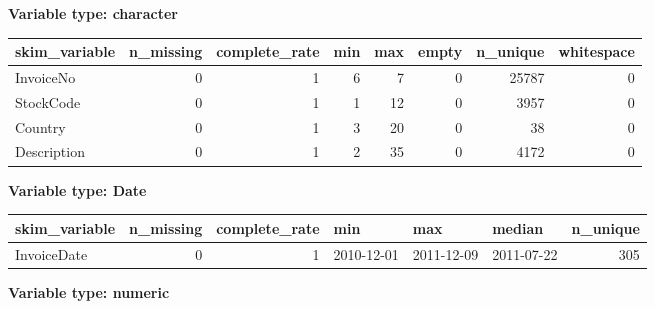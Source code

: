 \documentclass[]{article}
\begin{document}
\textbf{Variable type: character}

\begin{longtable}[]{@{}lrrrrrrr@{}}
\toprule
skim\_variable & n\_missing & complete\_rate & min & max & empty &
n\_unique & whitespace\tabularnewline
\midrule
\endhead
InvoiceNo & 0 & 1 & 6 & 7 & 0 & 25787 & 0\tabularnewline
StockCode & 0 & 1 & 1 & 12 & 0 & 3957 & 0\tabularnewline
Country & 0 & 1 & 3 & 20 & 0 & 38 & 0\tabularnewline
Description & 0 & 1 & 2 & 35 & 0 & 4172 & 0\tabularnewline
\bottomrule
\end{longtable}

\textbf{Variable type: Date}

\begin{longtable}[]{@{}lrrlllr@{}}
\toprule
skim\_variable & n\_missing & complete\_rate & min & max & median &
n\_unique\tabularnewline
\midrule
\endhead
InvoiceDate & 0 & 1 & 2010-12-01 & 2011-12-09 & 2011-07-22 &
305\tabularnewline
\bottomrule
\end{longtable}

\textbf{Variable type: numeric}
\end{document}
